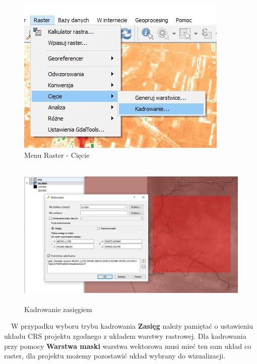 \documentclass[12pt,a4paper]{book}
\begin{document}
\begin{center}
\begin{figure}
\includegraphics[width=10.111cm,height=7.542cm]{004-raster-ciecie.png}
\caption{Menu Raster - Cięcie}
\end{figure}
\end{center}

\begin{center}
\begin{figure}
\includegraphics[width=13cm,height=7.091cm]{004-raster-kadrowanie.jpg}
\caption{Kadrowanie zasięgiem}
\end{figure}
\end{center}
\ \ W przypadku wyboru trybu kadrowania \textbf{Zasięg} należy pamiętać o ustawieniu układu CRS projektu zgodnego z układem warstwy rastrowej. Dla kadrowania przy pomocy \textbf{Warstwa maski} warstwa wektorowa musi mieć ten sam układ co raster, dla projektu możemy pozostawić układ wybrany do wizualizacji.
\end{document}
